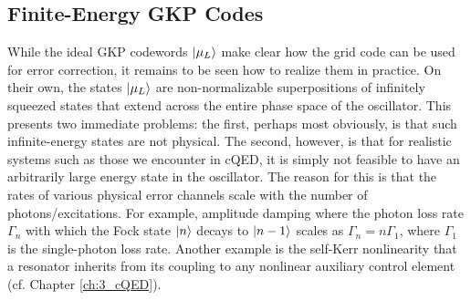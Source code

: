 \clearpage

\subsection{Finite-Energy GKP Codes}

While the ideal GKP codewords $\lvert\mu_L\rangle$ make clear how the grid code can be used for error correction, it remains to be seen how to realize them in practice. On their own, the states $\lvert\mu_L\rangle$ are non-normalizable superpositions of infinitely squeezed states that extend across the entire phase space of the oscillator. This presents two immediate problems: the first, perhaps most obviously, is that such infinite-energy states are not physical. The second, however, is that for realistic systems such as those we encounter in cQED, it is simply not feasible to have an arbitrarily large energy state in the oscillator. The reason for this is that the rates of various physical error channels scale with the number of photons/excitations. For example, amplitude damping where the photon loss rate $\Gamma_n$ with which the Fock state $\lvert n\rangle$ decays to $\lvert n-1\rangle$ scales as $\Gamma_n = n\Gamma_1$, where $\Gamma_1$ is the single-photon loss rate. Another example is the self-Kerr nonlinearity that a resonator inherits from its coupling to any nonlinear auxiliary control element (cf. Chapter \ref{ch:3_cQED}). 

